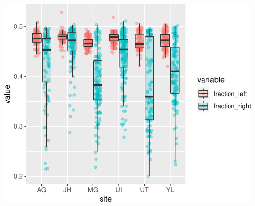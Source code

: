 \documentclass[
]{article}
\begin{document}
\begin{center}\includegraphics{paper_files/figure-latex/plot_hemi_early-1} \end{center}
\end{document}

